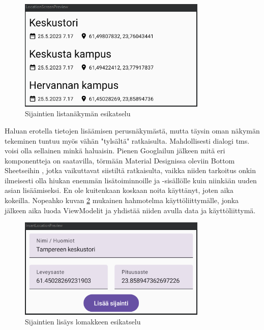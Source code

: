 \begin{figure}[h!]
    \centering
    \includegraphics[width=0.8\textwidth]{figures/exercise-6-location-screen.png}
    \caption{Sijaintien listanäkymän esikatselu}
    \label{fig:exercise-6-location-screen}
\end{figure}

Haluan erotella tietojen lisäämisen perusnäkymästä, mutta täysin oman näkymän
tekeminen tuntuu myös vähän "tylsältä" ratkaisulta. Mahdollisesti dialogi tms.
voisi olla sellainen minkä haluaisin. Pienen Googlailun jälkeen mitä eri
komponentteja on saatavilla, törmään Material Designissa oleviin Bottom
Sheetseihin \parencite{MaterialComponentsBottomSheets}, jotka vaikuttavat
siistiltä ratkaisulta, vaikka niiden tarkoitus onkin ilmeisesti olla hiukan
enemmän lisätoiminnoille ja -sisällölle kuin niinkään uuden asian lisäämiseksi.
En ole kuitenkaan koskaan noita käyttänyt, joten aika kokeilla. Nopeahko
kuvan \ref{fig:exercise-6-location-insert-screen} mukainen hahmotelma
käyttöliittymälle, jonka jälkeen aika luoda ViewModelit ja yhdistää niiden
avulla data ja käyttöliittymä.

\begin{figure}[!ht]
    \centering
    \includegraphics[width=0.8\textwidth]{figures/exercise-6-location-insert-screen.png}
    \caption{Sijaintien lisäys lomakkeen esikatselu}
    \label{fig:exercise-6-location-insert-screen}
\end{figure}

